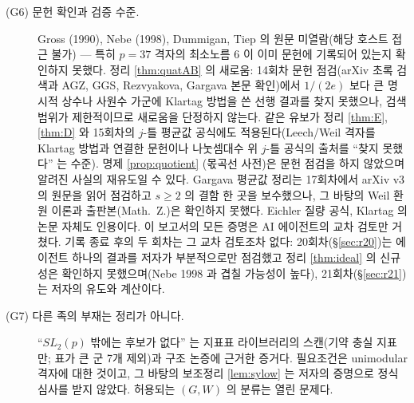 \begin{description}
\item[(G6) 문헌 확인과 검증 수준.] Gross (1990), Nebe (1998), Dummigan, Tiep 의 원문 미열람(해당 호스트 접근 불가) --- 특히 $p=37$ 격자의 최소노름 6 이 이미 문헌에 기록되어 있는지 확인하지 못했다. 정리 \ref{thm:quatAB} 의 새로움: 14회차 문헌 점검(arXiv 초록 검색과 AGZ, GGS, Rezvyakova, Gargava 본문 확인)에서 $1/(2e)$ 보다 큰 명시적 상수나 사원수 가군에 Klartag 방법을 쓴 선행 결과를 찾지 못했으나, 검색 범위가 제한적이므로 새로움을 단정하지 않는다. 같은 유보가 정리 \ref{thm:E}, \ref{thm:D} 와 15회차의 $j$-틀 평균값 공식에도 적용된다(Leech/Weil 격자를 Klartag 방법과 연결한 문헌이나 나눗셈대수 위 $j$-틀 공식의 출처를 ``찾지 못했다'' 는 수준). 명제 \ref{prop:quotient} (몫곡선 사전)은 문헌 점검을 하지 않았으며 알려진 사실의 재유도일 수 있다. Gargava 평균값 정리는 17회차에서 arXiv v3 의 원문을 읽어 점검하고 $s\ge2$ 의 결함 한 곳을 보수했으나, 그 바탕의 Weil 환원 이론과 출판본(Math.\ Z.)은 확인하지 못했다. Eichler 질량 공식, Klartag 의 논문 자체도 인용이다. 이 보고서의 모든 증명은 AI 에이전트의 교차 검토만 거쳤다. 기록 종료 후의 두 회차는 그 교차 검토조차 없다: 20회차(\S\ref{sec:r20})는 에이전트 하나의 결과를 저자가 부분적으로만 점검했고 정리 \ref{thm:ideal} 의 신규성은 확인하지 못했으며(Nebe 1998 과 겹칠 가능성이 높다), 21회차(\S\ref{sec:r21})는 저자의 유도와 계산이다.
\item[(G7) 다른 족의 부재는 정리가 아니다.] ``$SL_2(p)$ 밖에는 후보가 없다'' 는 지표표 라이브러리의 스캔(기약 충실 지표만; 표가 큰 군 7개 제외)과 구조 논증에 근거한 증거다. 필요조건은 unimodular 격자에 대한 것이고, 그 바탕의 보조정리 \ref{lem:sylow} 는 저자의 증명으로 정식 심사를 받지 않았다. 허용되는 $(G,W)$ 의 분류는 열린 문제다.
\end{description}


